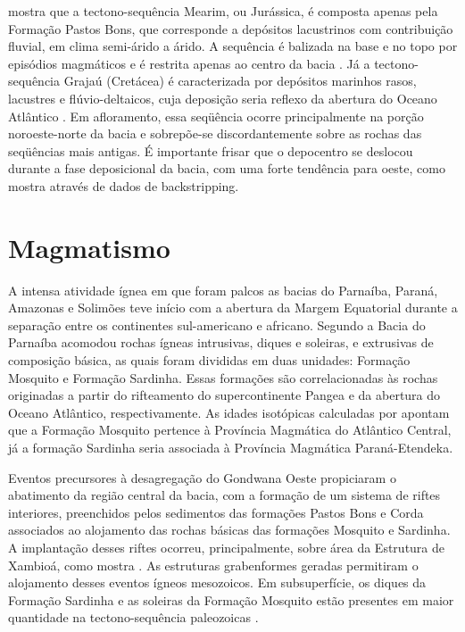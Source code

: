 \cite{vaz_bacia_2007} mostra que a tectono-sequência Mearim, ou Jurássica, é composta apenas pela Formação Pastos Bons, que corresponde a depósitos lacustrinos com contribuição fluvial, em clima semi-árido a árido. A sequência é balizada na base e no topo por episódios magmáticos e é restrita apenas ao centro da bacia \citep{tozer_crustal_2017}. Já a tectono-sequência Grajaú (Cretácea) é caracterizada por depósitos marinhos rasos, lacustres e flúvio-deltaicos, cuja deposição seria reflexo da abertura do Oceano Atlântico \citep{vaz_bacia_2007}. Em afloramento, essa seqüência ocorre principalmente na porção noroeste-norte da bacia e sobrepõe-se discordantemente sobre as rochas das seqüências mais antigas. É importante frisar que o depocentro se deslocou durante a fase deposicional da bacia, com uma forte tendência para oeste, como mostra \cite{tozer_crustal_2017} através de dados de backstripping. 

\section{Magmatismo}

A intensa atividade ígnea em que foram palcos as bacias do Parnaíba, Paraná, Amazonas e Solimões teve início com a abertura da Margem Equatorial durante a separação entre os continentes sul-americano e africano. Segundo \cite{vaz_bacia_2007} a Bacia do Parnaíba acomodou rochas ígneas intrusivas, diques e soleiras, e extrusivas de composição básica, as quais foram divididas em duas unidades: Formação Mosquito e Formação Sardinha. Essas formações são correlacionadas às rochas originadas a partir do rifteamento do supercontinente Pangea e da abertura do Oceano Atlântico, respectivamente. As idades isotópicas calculadas por \cite{merle_40ar_39ar_2011} apontam que a Formação Mosquito pertence à Província Magmática do Atlântico Central, já a formação Sardinha seria associada à Província Magmática Paraná-Etendeka.

Eventos precursores à desagregação do Gondwana Oeste propiciaram o abatimento da região central da bacia, com a formação de um sistema de riftes interiores, preenchidos pelos sedimentos das formações Pastos Bons e Corda associados ao alojamento das rochas básicas das formações Mosquito e Sardinha. A implantação desses riftes ocorreu, principalmente, sobre área da Estrutura de Xambioá, como mostra \cite{mocitaiba_cartografia_2017}. As estruturas grabenformes geradas permitiram o alojamento desses eventos ígneos mesozoicos. Em subsuperfície, os diques da Formação Sardinha e as soleiras da Formação Mosquito estão presentes em maior quantidade na tectono-sequência paleozoicas \citep{vaz_bacia_2007}.


